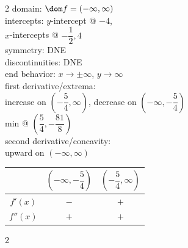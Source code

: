 \documentclass{book}
\begin{document}
\begin{appendices}
\begin{enumerate}[!HW!]
\begin{multicols}{2}
domain: $\dom f = (-\infty,\infty)$\\
intercepts: $y$-intercept @ $-4$,\\ $x$-intercepts @ $-\dfrac{1}{2},4$\\
symmetry: DNE\\ 
discontinuities: DNE\\
end behavior: $x\to\pm\infty$, $y\to\infty$\\
first derivative/extrema:\\ increase on $\left(-\dfrac{5}{4},\infty\right)$, decrease on $\left(-\infty,-\dfrac{5}{4}\right)$\\ min @ $\left(\dfrac{5}{4},-\dfrac{81}{8}\right)$ \\
second derivative/concavity:\\ upward on $(-\infty,\infty)$\vspace{-15pt}
\begin{center}
\begin{tabular}{c|c|c}
 & $\left(-\infty,-\dfrac{5}{4}\right)$ & $\left(-\dfrac{5}{4},\infty\right)$  \\ \hline
$f'(x)$ & $-$ & $+$ \\ 
$f''(x)$ & $+$ & $+$ \\ 
\end{tabular}
\end{center} 
\end{multicols}\pagebreak

\itemspade \mbox{}\vspace{-25pt}

\begin{multicols}{2}
\columnbreak


\end{multicols}
\end{enumerate}
\end{appendices}
\end{document}
